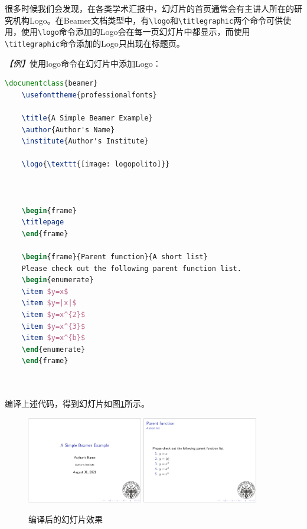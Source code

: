 很多时候我们会发现，在各类学术汇报中，幻灯片的首页通常会有主讲人所在的研究机构Logo。在Beamer文档类型中，有\texttt{\textbackslash{}logo}和\texttt{\textbackslash{}titlegraphic}两个命令可供使用，使用\texttt{\textbackslash{}logo}命令添加的Logo会在每一页幻灯片中都显示，而使用\texttt{\textbackslash{}titlegraphic}命令添加的Logo只出现在标题页。

\emph{【例】}使用logo命令在幻灯片中添加Logo：
\begin{lstlisting}[language=TeX]
    \documentclass{beamer}
    \usefonttheme{professionalfonts}

    \title{A Simple Beamer Example}
    \author{Author's Name}
    \institute{Author's Institute}

    \logo{\texttt{[image: logopolito]}}

    

    \begin{frame}
    \titlepage
    \end{frame}

    \begin{frame}{Parent function}{A short list}
    Please check out the following parent function list.
    \begin{enumerate}
    \item $y=x$
    \item $y=|x|$
    \item $y=x^{2}$
    \item $y=x^{3}$
    \item $y=x^{b}$
    \end{enumerate}
    \end{frame}

    
\end{lstlisting}

编译上述代码，得到幻灯片如图\ref{fig:934}所示。

\begin{figure}[htbp]
    \centering
    \includegraphics[width = 0.45\textwidth]{images/ch_9/example_sec2_7_0.png}
    \includegraphics[width = 0.45\textwidth]{images/ch_9/example_sec2_7_1.png}
    \caption{编译后的幻灯片效果}
    \label{fig:934}
\end{figure}

